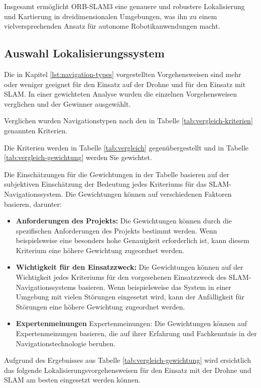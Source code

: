 Insgesamt ermöglicht ORB-SLAM3 eine genauere und robustere Lokalisierung und Kartierung in dreidimensionalen Umgebungen, was ihn zu einem vielversprechenden Ansatz für autonome Robotikanwendungen macht.


\subsection{Auswahl Lokalisierungssystem}

Die in Kapitel \ref{lst:navigation-types} vorgestellten Vorgehensweisen sind mehr oder weniger geeignet für den Einsatz auf der Drohne und für den Einsatz mit \ac{SLAM}.
In einer gewichteten Analyse wurden die einzelnen Vorgehensweisen verglichen und der Gewinner ausgewählt.

Verglichen wurden Navigationstypen nach den in Tabelle \ref{tab:vergleich-kriterien} genannten Kriterien.

Die Kriterien werden in Tabelle \ref{tab:vergleich} gegenübergestellt und in Tabelle \ref{tab:vergleich-gewichtung} werden Sie gewichtet.

Die Einschätzungen für die Gewichtungen in der Tabelle basieren auf der subjektiven Einschätzung der Bedeutung jedes Kriteriums für das \ac{SLAM}-Navigationssystem. Die Gewichtungen können auf verschiedenen Faktoren basieren, darunter:

\begin{itemize}
\item \textbf{Anforderungen des Projekts:} Die Gewichtungen können durch die spezifischen Anforderungen des Projekts bestimmt werden. Wenn beispielsweise eine besonders hohe Genauigkeit erforderlich ist, kann diesem Kriterium eine höhere Gewichtung zugeordnet werden.

\item \textbf{Wichtigkeit für den Einsatzzweck:} Die Gewichtungen können auf der Wichtigkeit jedes Kriteriums für den vorgesehenen Einsatzzweck des SLAM-Navigationssystems basieren. Wenn beispielsweise das System in einer Umgebung mit vielen Störungen eingesetzt wird, kann der Anfälligkeit für Störungen eine höhere Gewichtung zugeordnet werden.
\item \textbf{Expertenmeinungen} Expertenmeinungen: Die Gewichtungen können auf Expertenmeinungen basieren, die auf ihrer Erfahrung und Fachkenntnis in der Navigationstechnologie beruhen.
\end{itemize}

Aufgrund des Ergebnisses aus Tabelle \ref{tab:vergleich-gewichtung} wird ersichtlich das folgende Lokalisierungsvorgehensweisen für den Einsatz mit der Drohne und SLAM am besten eingesetzt werden können.

